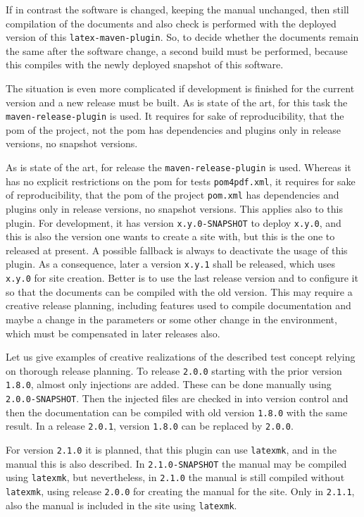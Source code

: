 \documentclass[a4paper,12pt,german,english]{book}
\begin{document}
If in contrast the software is changed, keeping the manual unchanged, 
then still compilation of the documents and also check 
is performed with the deployed version of this \texttt{latex-maven-plugin}. 
So, to decide whether the documents remain the same after the software change, 
a second build must be performed, 
because this compiles with the newly deployed snapshot of this software. 



The situation is even more complicated 
if development is finished for the current version 
and a new release must be built. 
As is state of the art, 
for this task the \texttt{maven-release-plugin} is used. 
It requires for sake of reproducibility, 
that the pom of the project, not the pom  has dependencies and plugins only in release versions, 
no snapshot versions. 

As is state of the art, 
for release the \texttt{maven-release-plugin} is used. 
Whereas it has no explicit restrictions on the pom for tests \texttt{pom4pdf.xml}, 
it requires for sake of reproducibility, 
that the pom of the project \texttt{pom.xml} has dependencies and plugins 
only in release versions, no snapshot versions. 
This applies also to this plugin. 
For development, it has version \texttt{x.y.0-SNAPSHOT} 
to deploy \texttt{x.y.0}, and this is also the version one wants to create a site with, 
but this is the one to released at present. 
A possible fallback is always to deactivate the usage of this plugin. 
As a consequence, later a version \texttt{x.y.1} shall be released, 
which uses \texttt{x.y.0} for site creation. 
Better is to use the last release version and to configure it so 
that the documents can be compiled with the old version. 
This may require a creative release planning, including features used to compile documentation 
and maybe a change in the parameters or some other change in the environment, 
which must be compensated in later releases also. 

Let us give examples of creative realizations of the described test concept 
relying on thorough release planning. 
To release \texttt{2.0.0} starting with the prior version \texttt{1.8.0}, 
almost only injections are added. 
These can be done manually using \texttt{2.0.0-SNAPSHOT}. 
Then the injected files are checked in into version control 
and then the documentation can be compiled with old version \texttt{1.8.0} 
with the same result. 
In a release \texttt{2.0.1}, version \texttt{1.8.0} can be replaced by \texttt{2.0.0}. 

For version \texttt{2.1.0} it is planned, that this plugin can use \texttt{latexmk}, 
and in the manual this is also described. 
In \texttt{2.1.0-SNAPSHOT} the manual may be compiled using \texttt{latexmk}, 
but nevertheless, in \texttt{2.1.0} the manual is still compiled without \texttt{latexmk}, 
using release \texttt{2.0.0} for creating the manual for the site. 
Only in \texttt{2.1.1}, also the manual is included in the site using \texttt{latexmk}. 
\end{document}

